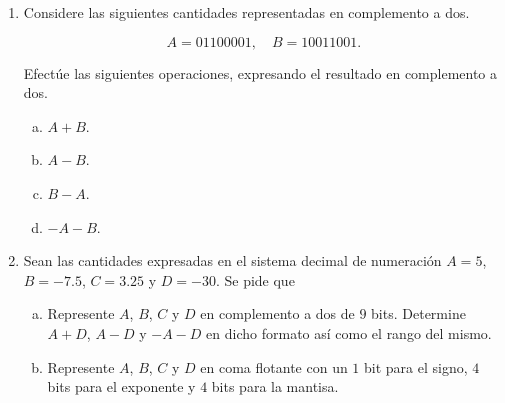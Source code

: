 \begin{frame}
  \begin{enumerate}
    \item

          Considere las siguientes cantidades representadas en
          complemento a dos.

          \begin{equation*}
            A=01100001,\quad
            B=10011001.
          \end{equation*}

          Efectúe las siguientes operaciones, expresando el resultado
          en complemento a dos.

          \begin{multicols}{4}
            \begin{enumerate}[a)]
              \item

                    $A+B$.

              \item

                    $A-B$.

              \item

                    $B-A$.

              \item

                    $-A-B$.
            \end{enumerate}
          \end{multicols}

    \item

          Sean las cantidades expresadas en el sistema decimal de
          numeración $A=5$, $B=-7.5$, $C=3.25$ y $D=-30$.
          Se pide que

          \begin{enumerate}[a)]
            \item

                  Represente $A$, $B$, $C$ y $D$ en complemento a dos
                  de $9$ bits.
                  Determine $A+D$, $A-D$ y $-A-D$ en dicho formato
                  así como el rango del mismo.

            \item\label{q2:b}

                  Represente $A$, $B$, $C$ y $D$ en coma flotante con
                  un $1$ bit para el signo, $4$ bits para el
                  exponente y $4$ bits para la mantisa.


\end{enumerate}
\end{enumerate}
\end{frame}
